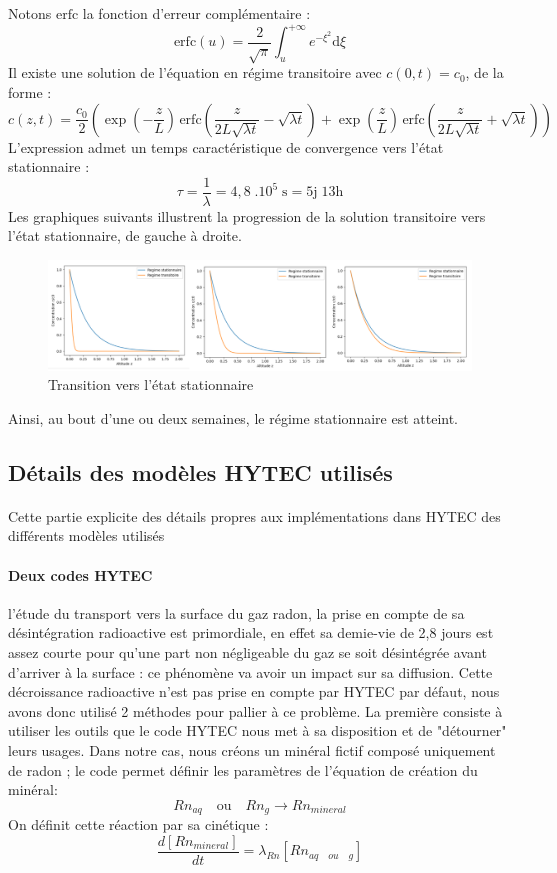 \documentclass{article}
\begin{document}
Notons $\text{erfc}$ la fonction d’erreur complémentaire :
$$
\text{erfc}(u)=\frac{2}{\sqrt{\pi}} \int_{u}^{+\infty } e^{-\xi^2} \text{d}\xi
$$
Il existe une solution de l’équation en régime transitoire avec $c(0,t)=c_0$, de la forme :
$$
c(z,t)=\frac{c_0}{2} \left( \exp\!\left(-\frac{z}{L}\right) \, \text{erfc}\!\left(\frac{z}{2L\sqrt{ \lambda t}} - \sqrt{\lambda t}\right) + \exp\!\left(\frac{z}{L}\right) \, \text{erfc}\!\left(\frac{z}{2L\sqrt{\lambda t}} + \sqrt{\lambda t} \right) \right)
$$
L’expression admet un temps caractéristique de convergence vers l’état stationnaire :
$$
\tau=\frac{1}{\lambda}=4,8 \; .10^5 \; \text{s}=5\text{j} \; 13\text{h}
$$
Les graphiques suivants illustrent la progression de la solution transitoire vers l'état stationnaire, de gauche à droite.
\begin{figure}[H]
    \centering
    \includegraphics[width = \linewidth]{III_C_3.png}
    \caption{Transition vers l'état stationnaire}
    \label{fig:diffusion_transitoire}
\end{figure}

Ainsi, au bout d'une ou deux semaines, le régime stationnaire est atteint.

\subsection{Détails des modèles HYTEC utilisés}
\label{annexe:detail_modele_radon_sub_sec}
\paragraph{}Cette partie explicite des détails propres aux implémentations dans HYTEC des différents modèles utilisés

\paragraph{Deux codes HYTEC}l'étude du transport vers la surface du gaz radon, la prise en compte de sa désintégration radioactive est primordiale, en effet sa demie-vie de 2,8 jours est assez courte pour qu'une part non négligeable du gaz se soit désintégrée  avant d'arriver à la surface : ce phénomène va avoir un impact sur sa diffusion. Cette décroissance radioactive n'est pas prise en compte par HYTEC par défaut, nous avons donc utilisé 2 méthodes pour pallier à ce problème.
La première consiste à utiliser les outils que le code HYTEC nous met à sa disposition et de "détourner" leurs usages. Dans notre cas, nous créons un minéral fictif composé uniquement de radon ; le code permet définir les paramètres de l'équation de création du minéral: 
$$Rn_{aq} \quad \text{ou} \quad Rn_{g} \rightarrow Rn_{mineral}$$
On définit cette réaction par sa cinétique : 
$$ \frac{d\left[ Rn_{mineral} \right]}{dt}=\lambda_{Rn} \left[ Rn_{aq \quad ou \quad g} \right] $$
\end{document}
